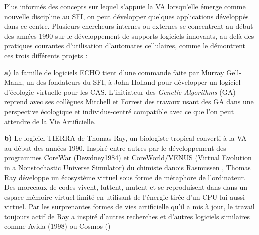 


Plus informés des concepts sur lequel s'appuie la VA lorsqu'elle émerge comme nouvelle discipline au SFI, on peut développer quelques applications développés dans ce centre. Plusieurs chercheurs internes ou externes se concentrent au début des années 1990 sur le développement de supports logiciels innovants, au-delà des pratiques courantes d'utilisation d'automates cellulaires, comme le démontrent ces trois différents projets :

\textbf{a)} la famille de logiciels ECHO tient d'une commande faite par Murray Gell-Mann, un des fondateurs du SFI, à John Holland pour développer un logiciel d'écologie virtuelle pour les CAS. L'initiateur des \textit{Genetic Algorithms} (GA) reprend avec ses collègues Mitchell et Forrest des travaux usant des GA dans une perspective écologique et individus-centré compatible avec ce que l'on peut attendre de la Vie Artificielle. \autocites{Holland1993, Mitchell1993, Smith2000}

\textbf{b)} Le logiciel TIERRA de Thomas Ray, un biologiste tropical converti à la VA au début des années 1990. Inspiré entre autres par le développement des programmes CoreWar (Dewdney1984) et CoreWorld/VENUS (Virtual Evolution in a Nonstochastic Universe Simulator) du chimiste danois Rasmussen \autocite{Rasmussen1990}, Thomas Ray développe un écosystème virtuel sous forme de métaphore de l'ordinateur. Des morceaux de codes vivent, luttent, mutent et se reproduisent dans dans un espace mémoire virtuel limité en utilisant de l'énergie tirée d'un CPU lui aussi virtuel. Par les surprenantes formes de vies artificielle qu'il a mis à jour, le travail toujours actif de Ray a inspiré d'autres recherches et d'autres logiciels similaires comme Avida (1998) ou Cosmos (\autocite{Taylor1999})

